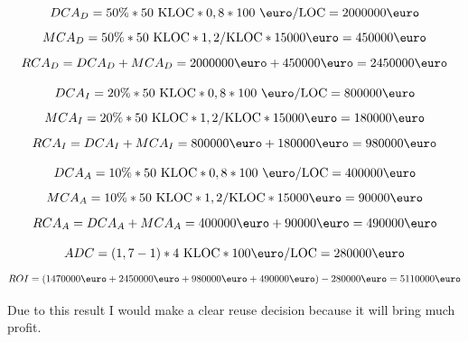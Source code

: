 \documentclass[a4paper,12pt,oneside]{scrreprt}
\begin{document}
\begin{equation*}
	DCA_D = 50\% * 50 \text{ KLOC} * 0,8 * 100\text{ \euro/LOC} = 2000000 \text{\euro}
\end{equation*}
\begin{equation*}
	MCA_D = 50\% * 50 \text{ KLOC} * 1,2/\text{KLOC} * 15000\text{\euro} = 450000\text{\euro}
\end{equation*}
\begin{equation*}
	RCA_D = DCA_D + MCA_D = 2000000\text{\euro} + 450000\text{\euro} = 2450000\text{\euro}
\end{equation*}

\begin{equation*}
	DCA_I = 20\% * 50 \text{ KLOC} * 0,8 * 100\text{ \euro/LOC} = 800000 \text{\euro}
\end{equation*}
\begin{equation*}
	MCA_I = 20\% * 50 \text{ KLOC} * 1,2/\text{KLOC} * 15000\text{\euro} = 180000\text{\euro}
\end{equation*}
\begin{equation*}
	RCA_I = DCA_I + MCA_I = 800000\text{\euro} + 180000\text{\euro} = 980000\text{\euro}
\end{equation*}

\begin{equation*}
	DCA_A = 10\% * 50 \text{ KLOC} * 0,8 * 100\text{ \euro/LOC} = 400000 \text{\euro}
\end{equation*}
\begin{equation*}
	MCA_A = 10\% * 50 \text{ KLOC} * 1,2/\text{KLOC} * 15000\text{\euro} = 90000\text{\euro}
\end{equation*}
\begin{equation*}
	RCA_A = DCA_A + MCA_A = 400000\text{\euro} + 90000\text{\euro} = 490000\text{\euro}
\end{equation*}

\begin{equation*}
	ADC =  (1,7 - 1) * 4\text{ KLOC} * 100 \text{\euro/LOC} = 280000\text{\euro}
\end{equation*}
\begin{equation*}
	ROI = (1470000\text{\euro} + 2450000\text{\euro} + 980000\text{\euro} + 490000\text{\euro}) - 280000\text{\euro} = 5110000\text{\euro}
\end{equation*}

Due to this result I would make a clear reuse decision because it will bring much profit.
\end{document}
